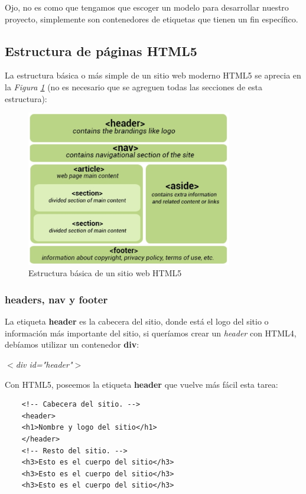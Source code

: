 Ojo, no es como que tengamos que escoger un modelo para desarrollar nuestro proyecto, simplemente son contenedores de etiquetas que tienen un fin específico.


\subsection{Estructura de páginas HTML5}

La estructura básica o más simple de un sitio web moderno HTML5 se aprecia en la \textit{Figura \ref{fig: 13}} (no es necesario que se agreguen todas las secciones de esta estructura):
\begin{figure}[H]
    \centering
    \caption{Estructura básica de un sitio web HTML5}
    \label{fig: 13}
    \includegraphics[width=9cm]{ss_html/estructura basica_html5.png}
\end{figure}


\subsubsection{headers, nav y footer}
\hspace{0.55cm}La etiqueta \textbf{header} es la cabecera del sitio, donde está el logo del sitio o información más importante del sitio, si queríamos crear un \textit{header} con HTML4, debíamos utilizar un contenedor \textbf{div}:
\begin{center}
    \textit{$<$div id="header"$>$}
\end{center}

Con HTML5, poseemos la etiqueta \textbf{header} que vuelve más fácil esta tarea:
\begin{lstlisting}
    <!-- Cabecera del sitio. -->
    <header>
	<h1>Nombre y logo del sitio</h1>
    </header>
    <!-- Resto del sitio. -->
    <h3>Esto es el cuerpo del sitio</h3>
    <h3>Esto es el cuerpo del sitio</h3>
    <h3>Esto es el cuerpo del sitio</h3>
\end{lstlisting}

